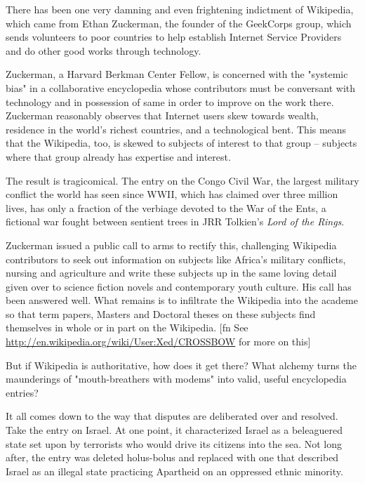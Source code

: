 There has been one very damning and even frightening indictment of
Wikipedia, which came from Ethan Zuckerman, the founder of the
GeekCorps group, which sends volunteers to poor countries to help
establish Internet Service Providers and do other good works
through technology.

Zuckerman, a Harvard Berkman Center Fellow, is concerned with the
"systemic bias" in a collaborative encyclopedia whose contributors
must be conversant with technology and in possession of same in
order to improve on the work there. Zuckerman reasonably observes
that Internet users skew towards wealth, residence in the world's
richest countries, and a technological bent. This means that the
Wikipedia, too, is skewed to subjects of interest to that group --
subjects where that group already has expertise and interest.

The result is tragicomical. The entry on the Congo Civil War, the
largest military conflict the world has seen since WWII, which has
claimed over three million lives, has only a fraction of the
verbiage devoted to the War of the Ents, a fictional war fought
between sentient trees in JRR Tolkien's
\emph{Lord of the Rings}.

Zuckerman issued a public call to arms to rectify this, challenging
Wikipedia contributors to seek out information on subjects like
Africa's military conflicts, nursing and agriculture and write
these subjects up in the same loving detail given over to science
fiction novels and contemporary youth culture. His call has been
answered well. What remains is to infiltrate the Wikipedia into the
academe so that term papers, Masters and Doctoral theses on these
subjects find themselves in whole or in part on the Wikipedia. [fn
See
\href{http://en.wikipedia.org/wiki/User:Xed/CROSSBOW}{http://en.wikipedia.org/wiki/User:Xed/CROSSBOW}
for more on this]

But if Wikipedia is authoritative, how does it get there? What
alchemy turns the maunderings of "mouth-breathers with modems" into
valid, useful encyclopedia entries?

It all comes down to the way that disputes are deliberated over and
resolved. Take the entry on Israel. At one point, it characterized
Israel as a beleaguered state set upon by terrorists who would
drive its citizens into the sea. Not long after, the entry was
deleted holus-bolus and replaced with one that described Israel as
an illegal state practicing Apartheid on an oppressed ethnic
minority.

